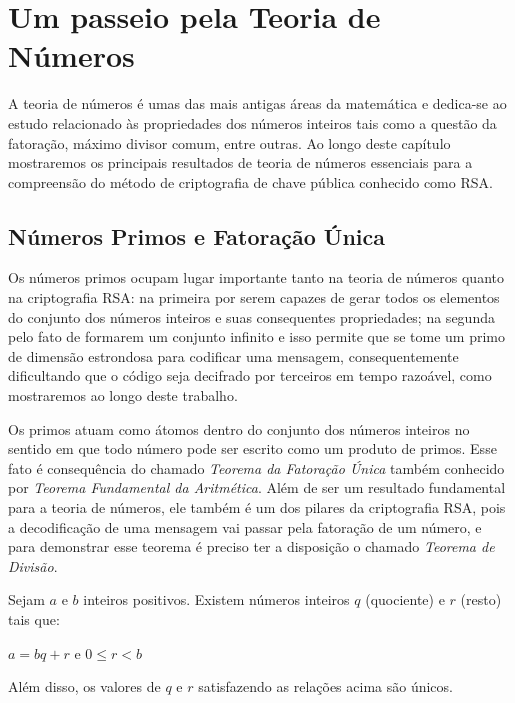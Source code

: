 \pagestyle{fancy}
\fancyhead[R]{\thepage}
\fancyfoot[C]{}


\chapter{Um passeio pela Teoria de N\'umeros}
\label{Num}

A teoria de n\'umeros \'e umas das mais antigas \'areas da matem\'atica e dedica-se ao estudo relacionado \`as propriedades dos n\'umeros inteiros tais como a quest\~ao da fatora\c{c}\~ao, m\'aximo divisor comum, entre outras. Ao longo deste cap\'itulo mostraremos os principais resultados de teoria de n\'umeros essenciais para a compreens\~ao do m\'etodo de criptografia de chave p\'ublica conhecido como RSA.

\section{N\'umeros Primos e Fatora\c{c}\~ao \'Unica}

Os n\'umeros primos ocupam lugar importante tanto na teoria de n\'umeros quanto na criptografia RSA: na primeira por serem capazes de gerar todos os elementos do conjunto dos n\'umeros inteiros e suas consequentes propriedades; na segunda pelo fato de formarem um conjunto infinito e isso permite que se tome um primo de dimens\~ao estrondosa para codificar uma mensagem, consequentemente dificultando que o c\'odigo seja decifrado por terceiros em tempo razo\'avel, como mostraremos ao longo deste trabalho.

Os primos atuam como \'atomos dentro do conjunto dos n\'umeros inteiros no sentido em que todo n\'umero pode ser escrito como um produto de primos. Esse fato \'e consequ\^encia do chamado \textit{Teorema da Fatora\c{c}\~ao \'Unica} tamb\'em conhecido por \textit{Teorema Fundamental da Aritm\'etica}. Al\'em de ser um resultado fundamental para a teoria de n\'umeros, ele tamb\'em \'e um dos pilares da criptografia RSA, pois a decodifica\c{c}\~ao de uma mensagem vai passar pela fatora\c{c}\~ao de um n\'umero, e para demonstrar esse teorema \'e preciso ter a disposi\c{c}\~ao o chamado \textit{Teorema de Divis\~ao}. 


\begin{Th}
\label{teo.div}
Sejam $a$ e $b$ inteiros positivos. Existem n\'umeros inteiros $q$ (quociente) e $r$ (resto) tais que:	
	\begin{center}
		$a=bq+r$ e $0\leq r <b$
	\end{center}
Al\'em disso, os valores de $q$ e $r$ satisfazendo as rela\c{c}\~oes acima s\~ao \'unicos.
\end{Th} 

